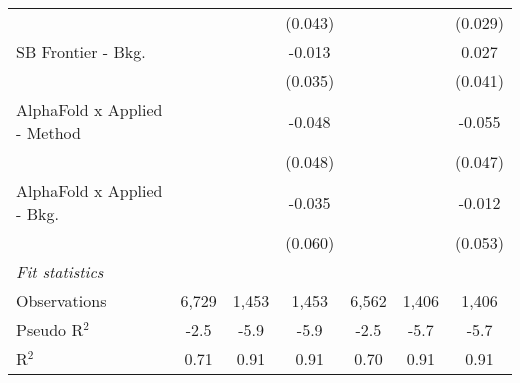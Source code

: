 \begin{tabular}{lcccccc}
                                &               &              & (0.043)    &               &             & (0.029)\\   
   SB Frontier - Bkg.           &               &              & -0.013     &               &             & 0.027\\   
                                &               &              & (0.035)    &               &             & (0.041)\\   
   AlphaFold x Applied - Method &               &              & -0.048     &               &             & -0.055\\   
                                &               &              & (0.048)    &               &             & (0.047)\\   
   AlphaFold x Applied - Bkg.   &               &              & -0.035     &               &             & -0.012\\   
                                &               &              & (0.060)    &               &             & (0.053)\\   
   \midrule
   \emph{Fit statistics}\\
   Observations                 & 6,729         & 1,453        & 1,453      & 6,562         & 1,406       & 1,406\\  
   Pseudo R$^2$                 & -2.5          & -5.9         & -5.9       & -2.5          & -5.7        & -5.7\\  
   R$^2$                        & 0.71          & 0.91         & 0.91       & 0.70          & 0.91        & 0.91\\  
   

\end{tabular}
